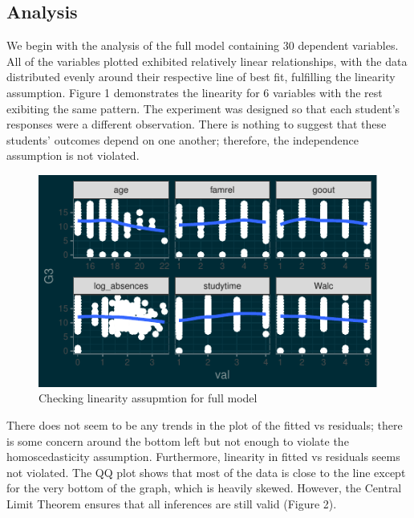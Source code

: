 \documentclass[letterpaper,9pt,twocolumn,twoside,]{pinp}
\begin{document}
\hypertarget{analysis}{%
\subsection{Analysis}\label{analysis}}

We begin with the analysis of the full model containing 30 dependent
variables. All of the variables plotted exhibited relatively linear
relationships, with the data distributed evenly around their respective
line of best fit, fulfilling the linearity assumption. Figure 1
demonstrates the linearity for 6 variables with the rest exibiting the
same pattern. The experiment was designed so that each student's
responses were a different observation. There is nothing to suggest that
these students' outcomes depend on one another; therefore, the
independence assumption is not violated.\linebreak

\begin{figure}
\includegraphics{report_files/figure-latex/unnamed-chunk-1-1} \caption{Checking linearity assupmtion for full model}\label{fig:unnamed-chunk-1}
\end{figure}

There does not seem to be any trends in the plot of the fitted vs
residuals; there is some concern around the bottom left but not enough
to violate the homoscedasticity assumption. Furthermore, linearity in
fitted vs residuals seems not violated. The QQ plot shows that most of
the data is close to the line except for the very bottom of the graph,
which is heavily skewed. However, the Central Limit Theorem ensures that
all inferences are still valid (Figure 2).\linebreak
\end{document}
